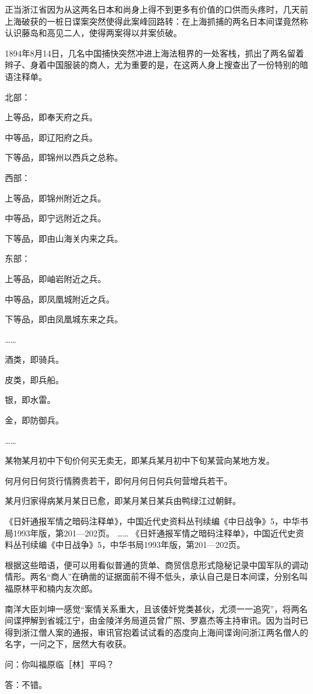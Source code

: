 \documentclass[12pt,UTF8]{ctexbook}
\begin{document}
正当浙江省因为从这两名日本和尚身上得不到更多有价值的口供而头疼时，几天前上海破获的一桩日谍案突然使得此案峰回路转：在上海抓捕的两名日本间谍竟然称认识藤岛和高见二人，使得两案得以并案侦破。

1894年8月14日，几名中国捕快突然冲进上海法租界的一处客栈，抓出了两名留着辫子、身着中国服装的商人，尤为重要的是，在这两人身上搜查出了一份特别的暗语注释单。

北部：

上等品，即奉天府之兵。

中等品，即辽阳府之兵。

下等品，即锦州以西兵之总称。

西部：

上等品，即锦州附近之兵。

中等品，即宁远附近之兵。

下等品，即由山海关内来之兵。

东部：

上等品，即岫岩附近之兵。

中等品，即凤凰城附近之兵。

下等品，即由凤凰城东来之兵。

……

酒类，即骑兵。

皮类，即兵船。

银，即水雷。

金，即防御兵。

……

某物某月初中下旬价何买无卖无，即某兵某月初中下旬某营向某地方发。

何月何日何货行情腾贵若干，即何月何日何兵何营增兵若干。

某月归家得病某月某日已愈，即某月某日某兵由鸭绿江过朝鲜。

《日奸通报军情之暗码注释单》，中国近代史资料丛刊续编《中日战争》5，中华书局1993年版，第201—202页。
…… 《日奸通报军情之暗码注释单》，中国近代史资料丛刊续编《中日战争》5，中华书局1993年版，第201—202页。

根据这些暗语，便可以用看似普通的货单、商贸信息形式隐秘记录中国军队的调动情形。两名“商人”在确凿的证据面前不得不低头，承认自己是日本间谍，分别名叫福原林平和楠内友次郎。

南洋大臣刘坤一感觉“案情关系重大，且该倭奸党类甚伙，尤须一一追究”，将两名间谍押解到省城江宁，由金陵洋务局道员曾广照、罗嘉杰等主持审讯。因为当时已得到浙江僧人案的通报，审讯官抱着试试看的态度向上海间谍询问浙江两名僧人的名字，一问之下，居然大有收获。

问：你叫福原临［林］平吗？

答：不错。
\end{document}
